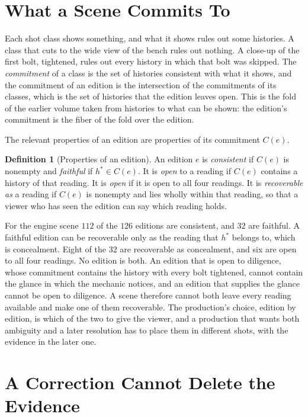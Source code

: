 \documentclass[11pt,twoside,openright]{book}
\theoremstyle{plain}
\theoremstyle{definition}
\newtheorem{definition}[theorem]{Definition}
\theoremstyle{remark}
\begin{document}
\section{What a Scene Commits To}\label{sec:commits}

Each shot class shows something, and what it shows rules out some histories. A class that cuts to the wide view of the bench rules out nothing. A close-up of the first bolt, tightened, rules out every history in which that bolt was skipped. The \emph{commitment} of a class is the set of histories consistent with what it shows, and the commitment of an edition is the intersection of the commitments of its classes, which is the set of histories that the edition leaves open. This is the fold of the earlier volume taken from histories to what can be shown: the edition's commitment is the fiber of the fold over the edition.

The relevant properties of an edition are properties of its commitment $C(e)$.

\begin{definition}[Properties of an edition]\label{def:props}
An edition $e$ is \emph{consistent} if $C(e)$ is nonempty and \emph{faithful} if $h^\ast\in C(e)$. It is \emph{open} to a reading if $C(e)$ contains a history of that reading. It is \emph{open} if it is open to all four readings. It is \emph{recoverable as} a reading if $C(e)$ is nonempty and lies wholly within that reading, so that a viewer who has seen the edition can say which reading holds.
\end{definition}

For the engine scene $112$ of the $126$ editions are consistent, and $32$ are faithful. A faithful edition can be recoverable only as the reading that $h^\ast$ belongs to, which is concealment. Eight of the $32$ are recoverable as concealment, and six are open to all four readings. No edition is both. An edition that is open to diligence, whose commitment contains the history with every bolt tightened, cannot contain the glance in which the mechanic notices, and an edition that supplies the glance cannot be open to diligence. A scene therefore cannot both leave every reading available and make one of them recoverable. The production's choice, edition by edition, is which of the two to give the viewer, and a production that wants both ambiguity and a later resolution has to place them in different shots, with the evidence in the later one.

\section{A Correction Cannot Delete the Evidence}\label{sec:guarantee}
\end{document}
